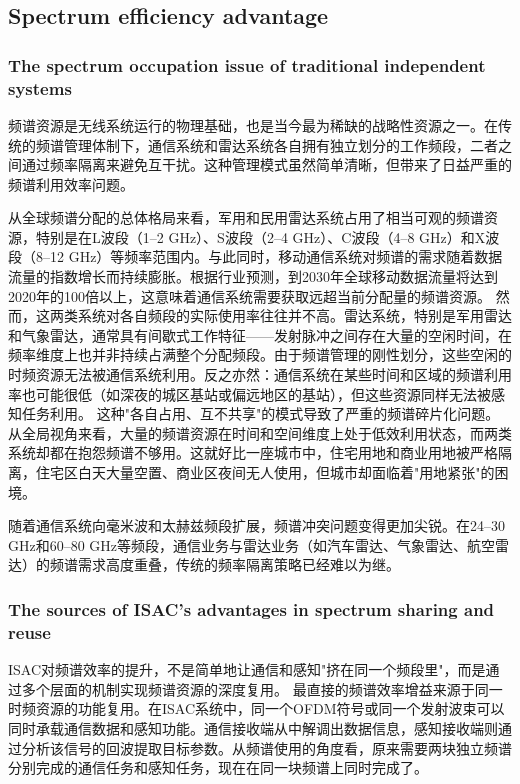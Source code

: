 \subsection{Spectrum efficiency advantage}
\label{subsec:ch1-isac-core value-spectrum}
\subsubsection{The spectrum occupation issue of traditional independent systems}
\label{subsubsec:ch1-isac-core value-spectrum-occupation}

频谱资源是无线系统运行的物理基础，也是当今最为稀缺的战略性资源之一。在传统的频谱管理体制下，通信系统和雷达系统各自拥有独立划分的工作频段，二者之间通过频率隔离来避免互干扰。这种管理模式虽然简单清晰，但带来了日益严重的频谱利用效率问题。

从全球频谱分配的总体格局来看，军用和民用雷达系统占用了相当可观的频谱资源，特别是在L波段（1–2 GHz）、S波段（2–4 GHz）、C波段（4–8 GHz）和X波段（8–12 GHz）等频率范围内。与此同时，移动通信系统对频谱的需求随着数据流量的指数增长而持续膨胀。根据行业预测，到2030年全球移动数据流量将达到2020年的100倍以上，这意味着通信系统需要获取远超当前分配量的频谱资源。
然而，这两类系统对各自频段的实际使用率往往并不高。雷达系统，特别是军用雷达和气象雷达，通常具有间歇式工作特征——发射脉冲之间存在大量的空闲时间，在频率维度上也并非持续占满整个分配频段。由于频谱管理的刚性划分，这些空闲的时频资源无法被通信系统利用。反之亦然：通信系统在某些时间和区域的频谱利用率也可能很低（如深夜的城区基站或偏远地区的基站），但这些资源同样无法被感知任务利用。
这种"各自占用、互不共享"的模式导致了严重的频谱碎片化问题。从全局视角来看，大量的频谱资源在时间和空间维度上处于低效利用状态，而两类系统却都在抱怨频谱不够用。这就好比一座城市中，住宅用地和商业用地被严格隔离，住宅区白天大量空置、商业区夜间无人使用，但城市却面临着"用地紧张"的困境。

随着通信系统向毫米波和太赫兹频段扩展，频谱冲突问题变得更加尖锐。在24–30 GHz和60–80 GHz等频段，通信业务与雷达业务（如汽车雷达、气象雷达、航空雷达）的频谱需求高度重叠，传统的频率隔离策略已经难以为继。

\subsubsection{The sources of ISAC's advantages in spectrum sharing and reuse}
\label{subsubsec:ch1-adv source of isac-spectrum}

ISAC对频谱效率的提升，不是简单地让通信和感知"挤在同一个频段里"，而是通过多个层面的机制实现频谱资源的深度复用。
最直接的频谱效率增益来源于同一时频资源的功能复用。在ISAC系统中，同一个OFDM符号或同一个发射波束可以同时承载通信数据和感知功能。通信接收端从中解调出数据信息，感知接收端则通过分析该信号的回波提取目标参数。从频谱使用的角度看，原来需要两块独立频谱分别完成的通信任务和感知任务，现在在同一块频谱上同时完成了。

